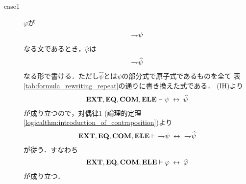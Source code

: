 \begin{sketch}
\begin{description}
\begin{description}
						\begin{description}
							\item[case1] $\varphi$が
								\begin{align}
									\rightharpoondown\hspace{-0.25em} \psi
								\end{align}
								なる文であるとき，$\widehat{\varphi}$は
								\begin{align}
									\rightharpoondown\hspace{-0.25em} \widehat{\psi}
								\end{align}
								なる形で書ける．ただし$\widehat{\psi}$とは$\psi$の部分式で原子式であるものを全て
								表\ref{tab:formula_rewriting_repeat}の通りに書き換えた式である．
								(IH)より
								\begin{align}
									\mbox{{\bf EXT}},\mbox{{\bf EQ}},\mbox{\bf COM},\mbox{{\bf ELE}} \vdash \psi \hspace{0.25em}\leftrightarrow\hspace{0.25em} \widehat{\psi}
								\end{align}
								が成り立つので，対偶律1 (論理的定理\ref{logicalthm:introduction_of_contraposition})より
								\begin{align}
									\EXTAX,\EQAX,\COMAX,\ELEAX \vdash\ \negation \psi \lrarrow\ \negation \widehat{\psi}
								\end{align}
								が従う．すなわち
								\begin{align}
									\mbox{{\bf EXT}},\mbox{{\bf EQ}},\mbox{\bf COM},\mbox{{\bf ELE}} \vdash \varphi \hspace{0.25em}\leftrightarrow\hspace{0.25em} \widehat{\varphi}
								\end{align}
								が成り立つ．
								

\end{description}
\end{description}
\end{description}
\end{sketch}
